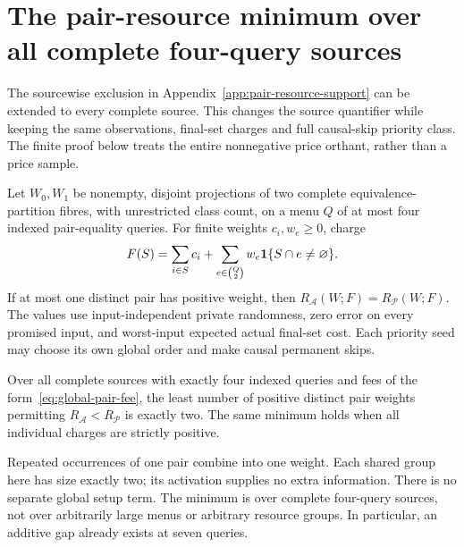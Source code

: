 \section{The pair-resource minimum over all complete four-query sources}
\label{app:global-pair-support}
The sourcewise exclusion in Appendix~\ref{app:pair-resource-support}
can be extended to every complete source. This changes the source
quantifier while keeping the same observations, final-set charges and
full causal-skip priority class. The finite proof below treats the
entire nonnegative price orthant, rather than a price sample.

\begin{theorem}
\label{thm:global-pair-resource-minimum}
Let $W_0,W_1$ be nonempty, disjoint projections of two complete
equivalence-partition fibres, with unrestricted class count, on a menu
$Q$ of at most four indexed pair-equality queries. For finite weights
$c_i,w_e\geq0$, charge
\begin{equation}\label{eq:global-pair-fee}
 F(S)=\sum_{i\in S}c_i+
       \sum_{e\in\binom Q2} w_e{\bf1}\{S\cap e\ne\varnothing\}.
\end{equation}
If at most one distinct pair has positive weight, then
$R_{\mathcal A}(W;F)=R_{\mathcal P}(W;F)$.
The values use input-independent private randomness, zero error on
every promised input, and worst-input expected actual final-set cost.
Each priority seed may choose its own global order and make causal
permanent skips.

Over all complete sources with exactly four indexed queries and fees
of the form~\eqref{eq:global-pair-fee}, the least number of positive
distinct pair weights permitting $R_{\mathcal A}<R_{\mathcal P}$ is
exactly two. The same minimum holds when all individual charges are
strictly positive.
\end{theorem}
Repeated occurrences of one pair combine into one weight. Each shared
group here has size exactly two; its activation supplies no extra
information. There is no separate global setup term. The minimum is
over complete four-query sources, not over arbitrarily large menus or
arbitrary resource groups. In particular, an additive gap already
exists at seven queries.

